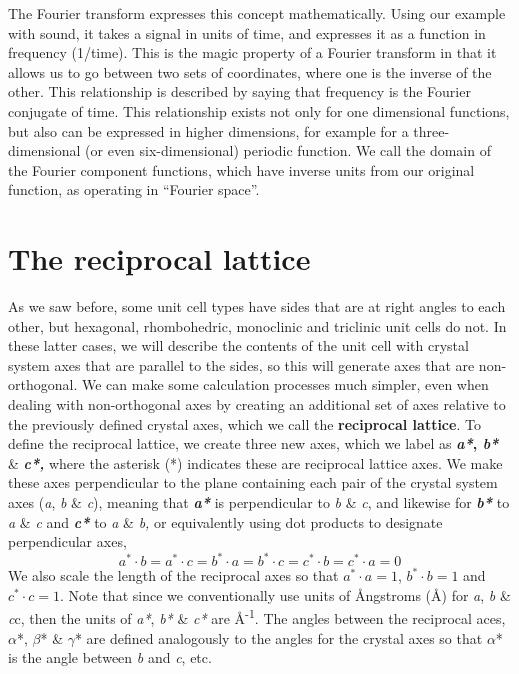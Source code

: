 The Fourier transform expresses this concept mathematically. Using our example with sound, it takes a signal in units of time, and expresses it as a function in frequency (1/time). This is the magic property of a Fourier transform in that it allows us to go between two sets of coordinates, where one is the inverse of the other. This relationship is described by saying that frequency is the Fourier conjugate of time. This relationship exists not only for one dimensional functions, but also can be expressed in higher dimensions, for example for a three-dimensional (or even six-dimensional) periodic function. We call the domain of the Fourier component functions, which have inverse units from our original function, as operating in ``Fourier space''.

\section{The reciprocal lattice}

As we saw before, some unit cell types have sides that are at right angles to each other, but hexagonal, rhombohedric, monoclinic and triclinic unit cells do not. 
In these latter cases, we will describe the contents of the unit cell with crystal system axes that are parallel to the sides, so this will generate axes that are non-orthogonal. 
We can make some calculation processes much simpler, even when dealing with non-orthogonal axes by creating an additional set of axes relative to the previously defined crystal axes, which we call the \textbf{reciprocal lattice}. 
To define the reciprocal lattice, we create three new axes, which we label as \textbf{\textit{a*}, \textit{b*} }\&\textbf{ \textit{c*,}} where the asterisk (*) indicates these are reciprocal lattice axes. We make these axes perpendicular to the plane containing each pair of the crystal system axes (\textit{a}, \textit{b} \& \textit{c}), meaning that \textbf{\textit{a*}} is perpendicular to \textit{b} \& \textit{c}, and likewise for \textit{\textbf{b*}} to \textit{a} \& \textit{c} and \textbf{\textit{c*}} to \textit{a} \& \textit{b,} or equivalently using dot products to designate perpendicular axes, 
$$a^*\cdot b =  a^* \cdot c = b^* \cdot a =  b^* \cdot c =  c^* \cdot b =  c^* \cdot a = 0$$ 
We also scale the length of the reciprocal axes so that $a^*\cdot a = 1$, $b^*\cdot b = 1$ and $c^*\cdot c = 1$. Note that since we conventionally use units of Ångstroms (Å) for \textit{a}, \textit{b} \& \textit{c}c, then the units of \textit{a*}, \textit{b*} \& \textit{c*} are Å\textsuperscript{-1}. The angles between the reciprocal aces, $\alpha$*, $\beta$* \& $\gamma$* are defined analogously to the angles for the crystal axes so that $\alpha$* is the angle between \textit{b} and \textit{c}, etc. 

